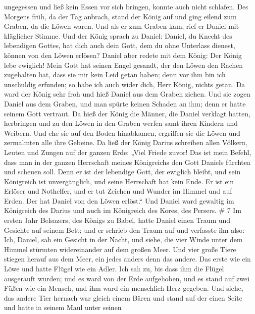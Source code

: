 ungegessen und ließ kein Essen vor sich bringen, konnte auch nicht
schlafen.  Des Morgens früh, da der Tag anbrach, stand der
König auf und ging eilend zum Graben, da die Löwen waren. 
Und als er zum Graben kam, rief er Daniel mit kläglicher Stimme. Und der
König sprach zu Daniel: Daniel, du Knecht des lebendigen Gottes, hat
dich auch dein Gott, dem du ohne Unterlass dienest, können von den Löwen
erlösen?  Daniel aber redete mit dem König: Der König lebe
ewiglich!  Mein Gott hat seinen Engel gesandt, der den
Löwen den Rachen zugehalten hat, dass sie mir kein Leid getan haben;
denn vor ihm bin ich unschuldig erfunden; so habe ich auch wider dich,
Herr König, nichts getan.  Da ward der König sehr froh und
hieß Daniel aus dem Graben ziehen. Und sie zogen Daniel aus dem Graben,
und man spürte keinen Schaden an ihm; denn er hatte seinem Gott
vertraut.  Da hieß der König die Männer, die Daniel
verklagt hatten, herbringen und zu den Löwen in den Graben werfen samt
ihren Kindern und Weibern. Und ehe sie auf den Boden hinabkamen,
ergriffen sie die Löwen und zermalmten alle ihre Gebeine. 
Da ließ der König Darius schreiben allen Völkern, Leuten und Zungen auf
der ganzen Erde: „Viel Friede zuvor!  Das ist mein Befehl,
dass man in der ganzen Herrschaft meines Königreichs den Gott Daniels
fürchten und scheuen soll. Denn er ist der lebendige Gott, der ewiglich
bleibt, und sein Königreich ist unvergänglich, und seine Herrschaft hat
kein Ende.  Er ist ein Erlöser und Nothelfer, und er tut
Zeichen und Wunder im Himmel und auf Erden. Der hat Daniel von den Löwen
erlöst.``  Und Daniel ward gewaltig im Königreich des
Darius und auch im Königreich des Kores, des Persers. \# 7 
Im ersten Jahr Belsazers, des Königs zu Babel, hatte Daniel einen Traum
und Gesichte auf seinem Bett; und er schrieb den Traum auf und verfasste
ihn also:  Ich, Daniel, sah ein Gesicht in der Nacht, und
siehe, die vier Winde unter dem Himmel stürmten widereinander auf dem
großen Meer.  Und vier große Tiere stiegen herauf aus dem
Meer, ein jedes anders denn das andere.  Das erste wie ein
Löwe und hatte Flügel wie ein Adler. Ich sah zu, bis dass ihm die Flügel
ausgerauft wurden; und es ward von der Erde aufgehoben, und es stand auf
zwei Füßen wie ein Mensch, und ihm ward ein menschlich Herz gegeben.
 Und siehe, das andere Tier hernach war gleich einem Bären
und stand auf der einen Seite und hatte in seinem Maul unter seinen
